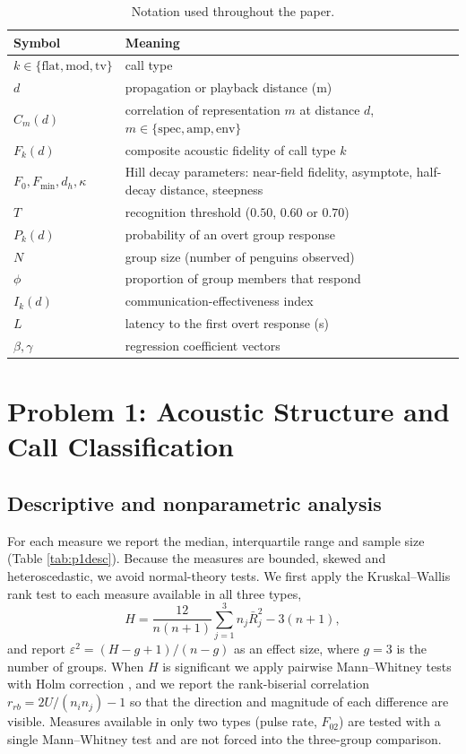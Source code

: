 \documentclass{apmcmthesis}
\begin{document}
\begin{table}[!ht]
\centering
\caption{Notation used throughout the paper.}
\label{tab:notation}
\small
\begin{tabular}{ll}
\toprule
Symbol & Meaning \\
\midrule
$k\in\{\mathrm{flat},\mathrm{mod},\mathrm{tv}\}$ & call type \\
$d$ & propagation or playback distance (m) \\
$C_m(d)$ & correlation of representation $m$ at distance $d$, $m\in\{\mathrm{spec},\mathrm{amp},\mathrm{env}\}$ \\
$F_k(d)$ & composite acoustic fidelity of call type $k$ \\
$F_0,F_{\min},d_h,\kappa$ & Hill decay parameters: near-field fidelity, asymptote, half-decay distance, steepness \\
$T$ & recognition threshold ($0.50$, $0.60$ or $0.70$) \\
$P_k(d)$ & probability of an overt group response \\
$N$ & group size (number of penguins observed) \\
$\phi$ & proportion of group members that respond \\
$I_k(d)$ & communication-effectiveness index \\
$L$ & latency to the first overt response (s) \\
$\beta,\gamma$ & regression coefficient vectors \\
\bottomrule
\end{tabular}
\end{table}

\section{Problem 1: Acoustic Structure and Call Classification}

\subsection{Descriptive and nonparametric analysis}

For each measure we report the median, interquartile range and sample size (Table \ref{tab:p1desc}). Because the measures are bounded, skewed and heteroscedastic, we avoid normal-theory tests. We first apply the Kruskal--Wallis rank test \cite{kruskal1952} to each measure available in all three types,
\begin{equation}
H=\frac{12}{n(n+1)}\sum_{j=1}^{3}n_j\bar R_j^2-3(n+1),
\label{eq:kw}
\end{equation}
and report $\varepsilon^2=(H-g+1)/(n-g)$ as an effect size, where $g=3$ is the number of groups. When $H$ is significant we apply pairwise Mann--Whitney tests with Holm correction \cite{holm1979}, and we report the rank-biserial correlation $r_{rb}=2U/(n_in_j)-1$ so that the direction and magnitude of each difference are visible. Measures available in only two types (pulse rate, $F_{02}$) are tested with a single Mann--Whitney test and are not forced into the three-group comparison.
\end{document}
